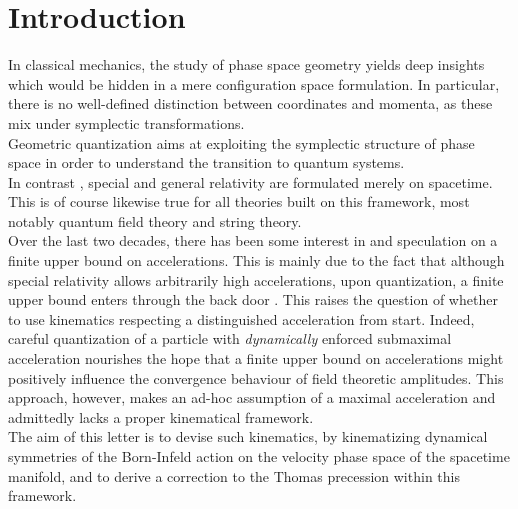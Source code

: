\documentclass[11pt,a4paper,twoside]{article}
\begin{document}
\section{Introduction}
In classical mechanics, the study of phase space geometry yields
deep insights which would be hidden in a mere configuration space
formulation. In particular, there is no well-defined distinction between
coordinates and momenta, as these mix under symplectic transformations.\\
Geometric quantization aims at exploiting the symplectic structure of
phase space in order to understand the transition to quantum systems.\\
In contrast \cite{Born}, special and general relativity are formulated merely on
spacetime. This is of course likewise
true for all theories built on this framework, most notably quantum
field theory and string theory.\\[5pt]
Over the last two decades, there has been some interest in and
speculation on a finite upper bound on accelerations. This is mainly
due to the fact that although special relativity allows
arbitrarily high accelerations, upon quantization, a finite upper
bound enters through the back door \cite{Brandt2}.
This raises the question of whether to use kinematics respecting a
distinguished acceleration from start.
Indeed,
careful quantization of a particle with \textsl{dynamically} enforced submaximal
acceleration \cite{Nesterenko} nourishes the hope
that a finite upper bound on accelerations might positively influence
the convergence behaviour of field theoretic amplitudes. This
approach, however, makes an ad-hoc assumption of a maximal
acceleration and admittedly lacks a proper kinematical framework.\\[5pt]
The aim of this letter is to devise such kinematics, by kinematizing dynamical
symmetries of the Born-Infeld action on the velocity phase space of the
spacetime manifold, and to derive a correction to the Thomas
precession within this framework.
\end{document}
